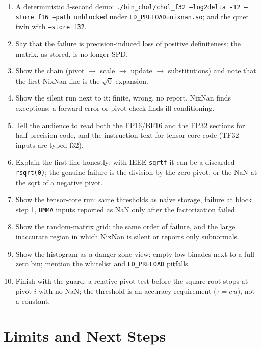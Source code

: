 \documentclass[11pt,a4paper]{article}
\begin{document}
\begin{enumerate}
  \item A deterministic 3-second demo: \texttt{./bin\_chol/chol\_f32 --log2delta -12 --store f16 --path unblocked} under \texttt{LD\_PRELOAD=nixnan.so}; and the quiet twin with \texttt{--store f32}.
  \item Say that the failure is precision-induced loss of positive definiteness: the matrix, as stored, is no longer SPD.
  \item Show the chain (pivot $\to$ scale $\to$ update $\to$ substitutions) and note that the first NixNan line is the $\sqrt0$ expansion.
  \item Show the silent run next to it: finite, wrong, no report. NixNan finds exceptions; a forward-error or pivot check finds ill-conditioning.
  \item Tell the audience to read both the FP16/BF16 and the FP32 sections for half-precision code, and the instruction text for tensor-core code (TF32 inputs are typed f32).
  \item Explain the first line honestly: with IEEE \texttt{sqrtf} it can be a discarded \texttt{rsqrt(0)}; the genuine failure is the division by the zero pivot, or the NaN at the sqrt of a negative pivot.
  \item Show the tensor-core run: same thresholds as naive storage, failure at block step 1, \texttt{HMMA} inputs reported as NaN only after the factorization failed.
  \item Show the random-matrix grid: the same order of failure, and the large inaccurate region in which NixNan is silent or reports only subnormals.
  \item Show the histogram as a danger-zone view: empty low binades next to a full zero bin; mention the whitelist and \texttt{LD\_PRELOAD} pitfalls.
  \item Finish with the guard: a relative pivot test before the square root stops at pivot $i$ with no NaN; the threshold is an accuracy requirement ($\tau=c\,u$), not a constant.
\end{enumerate}

\section{Limits and Next Steps}\label{sec:next}
\end{document}
